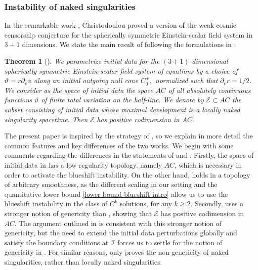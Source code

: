 \documentclass[11pt]{article}
\newtheorem{theorem}{Theorem}[section]
\numberwithin{equation}{section}
\begin{document}
\subsubsection{Instability of naked singularities}\label{Christodoulou section}

In the remarkable work \cite{ChrWCC}, Christodoulou proved a version of the weak cosmic censorship conjecture for the spherically symmetric Einstein-scalar field system in $3+1$ dimensions. We state the main result of \cite{ChrWCC} following the formulations in \cite{ChrWCC,C99-GL,Wccsurvey}:
\begin{theorem}[\cite{ChrWCC}]\label{Chr theorem}
    We parametrize initial data for the $(3+1)$-dimensional spherically symmetric Einstein-scalar field system of equations by a choice of $\vartheta=r\partial_v\phi$ along an initial outgoing null cone $C_0^+,$ normalized such that $\partial_vr=1/2.$ We consider as the space of initial data the space $AC$ of all absolutely continuous functions $\vartheta$ of finite total variation on the half-line. We denote by $\mathcal{E}\subset AC$ the subset consisting of initial data whose maximal development is a locally naked singularity spacetime. Then $\mathcal{E}$ has positive codimension in $AC.$
\end{theorem}

The present paper is inspired by the strategy of \cite{ChrWCC}, so we explain in more detail the common features and key differences of the two works. We begin with some comments regarding the differences in the statements of  and . Firstly, the space of initial data in  has a low-regularity topology, namely $AC$, which is necessary in order to activate the blueshift instability. On the other hand,  holds in a topology of arbitrary smoothness, as the different scaling in our setting and the quantitative lower bound \eqref{lower bound blueshift intro} allow us to use the blueshift instability in the class of $C^k$ solutions, for any $k\geq2.$ Secondly,  uses a stronger notion of genericity than , showing that $\mathcal{E}$ has positive codimension in $AC.$ The argument outlined in  is consistent with this stronger notion of genericity, but the need to extend the initial data perturbations globally and satisfy the boundary conditions at $\mathcal{I}$ forces us to settle for the notion of genericity in . For similar reasons,  only proves the non-genericity of naked singularities, rather than locally naked singularities.
\end{document}
